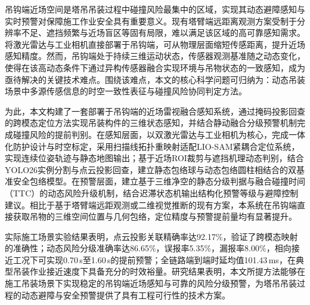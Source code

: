 \begin{cabstract}
吊钩端近场空间是塔吊吊装过程中碰撞风险最集中的区域，实现其动态避障感知与实时预警对保障施工作业安全具有重要意义。现有塔臂端远距离观测方案受制于分辨率不足、遮挡频繁与近场盲区等固有局限，难以满足该区域的高可靠感知需求。将激光雷达与工业相机直接部署于吊钩端，可从物理层面缩短传感距离，提升近场感知精度。然而，吊钩端处于持续三维运动状态，传感器观测基准随之动态变化，使得在该高动态条件下通过异构传感器融合实现环境与吊物状态的一致感知，成为亟待解决的关键技术难点。围绕该难点，本文的核心科学问题可归纳为：动态吊装场景中多源传感信息的时空一致性表征与碰撞风险协同判定方法。

为此，本文构建了一套部署于吊钩端的近场雷视融合感知系统，通过掩码投影回查的跨模态定位方法实现吊装构件的三维状态感知，并结合静动融合分级预警机制完成碰撞风险的提前判别。在感知层面，以双激光雷达与工业相机为核心，完成一体化防护设计与时空标定，采用扫描线拓扑重映射适配LIO-SAM紧耦合定位系统，实现连续位姿轨迹与静态地图输出；基于近场ROI裁剪与遮挡机理动态判别，结合YOLO26实例分割与点云投影回查，建立静态包络球与动态包络圆柱相结合的双基准安全包络模型。在预警层面，建立基于三维净空的静态分级判据与融合碰撞时间（TTC）的动态风险升级机制，结合迟滞状态机输出结构化预警等级与避障控制建议。相比于基于塔臂端远距观测或二维视觉推断的现有方案，本系统在吊钩端直接获取吊物的三维空间位置与几何包络，定位精度与预警提前量均有显著提升。

实际施工场景实验结果表明，点云投影关联精确率达92.17\%，验证了跨模态映射的准确性；动态风险分级准确率达86.65\%，误报率5.35\%，漏报率8.00\%，相向接近工况下可实现0.70\,s至1.60\,s的提前预警；全链路端到端时延均值101.43\,ms，在典型吊装作业接近速度下具备充分的时效裕量。研究结果表明，本文所提方法能够在施工吊装场景下实现稳定的吊钩端近场感知与可靠的风险分级预警，为塔吊吊装过程的动态避障与安全预警提供了具有工程可行性的技术方案。
\end{cabstract}



